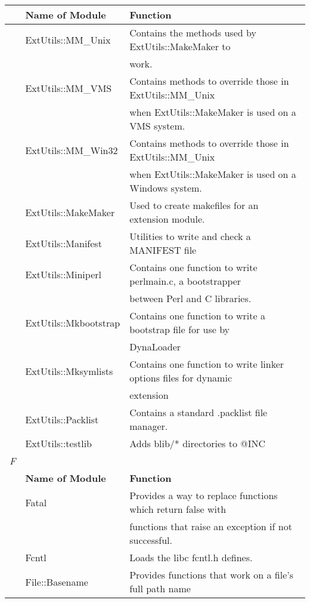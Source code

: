 \documentclass[a4paper,11pt]{book}
\begin{document}
\begin{tabular}{|p{0.2in}|p{1.3in}|p{2.6in}|} \hline 
 & \textbf{Name of Module} & \textbf{Function} \\ \hline 
 & ExtUtils::MM\_Unix & Contains the methods used by ExtUtils::MakeMaker to \\ \hline 
 &  & work. \\ \hline 
 & ExtUtils::MM\_VMS & Contains methods to override those in ExtUtils::MM\_Unix \\ \hline 
 &  & when ExtUtils::MakeMaker is used on a VMS system. \\ \hline 
 & ExtUtils::MM\_Win32 & Contains methods to override those in ExtUtils::MM\_Unix \\ \hline 
 &  & when ExtUtils::MakeMaker is used on a Windows system. \\ \hline 
 & ExtUtils::MakeMaker & Used to create makefiles for an extension module. \\ \hline 
 & ExtUtils::Manifest & Utilities to write and check a MANIFEST file \\ \hline 
 & ExtUtils::Miniperl & Contains one function to write perlmain.c, a bootstrapper \\ \hline 
 &  & between Perl and C libraries. \\ \hline 
 & ExtUtils::Mkbootstrap & Contains one function to write a bootstrap file for use by \\ \hline 
 &  & DynaLoader \\ \hline 
 & ExtUtils::Mksymlists & Contains one function to write linker options files for dynamic \\ \hline 
 &  & extension \\ \hline 
 & ExtUtils::Packlist & Contains a standard .packlist file manager. \\ \hline 
 & ExtUtils::testlib & Adds blib/* directories to @INC \\ \hline 
\newline \textit{F} &  &  \\ \hline 
 & \textbf{Name of Module} & \textbf{Function} \\ \hline 
 & Fatal & Provides a way to replace functions which return false with \\ \hline 
 &  & functions that raise an exception if not successful. \\ \hline 
 & Fcntl & Loads the libc fcntl.h defines. \\ \hline 
 & File::Basename & Provides functions that work on a file's full path name \\ \hline 

\end{tabular}
\end{document}
